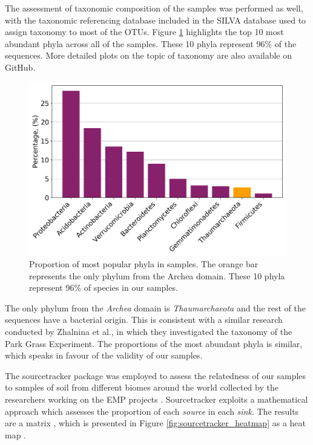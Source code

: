 \documentclass[12pt,twocolumn]{article} %
\begin{document}
\par
The assessment of taxonomic composition of the samples was performed as well, with the taxonomic referencing database included in the SILVA database used to assign taxonomy to most of the OTUs. Figure \ref{fig:top_taxa} highlights the top 10 most abundant phyla across all of the samples. These 10 phyla represent 96\% of the sequences. More detailed plots on the topic of taxonomy are also available on GitHub\cite{Anonymous2018}.
\begin{figure}[ht!] %
	\includegraphics[width=\linewidth]{top_10.png}
	\caption{Proportion of most popular phyla in samples. The orange bar represents the only phylum from the Archea domain. These 10 phyla represent 96\% of species in our samples.}
	\label{fig:top_taxa}
\end{figure}
\par
The only phylum from the \textit{Archea} domain is \textit{Thaumarchaeota} and the rest of the  sequences have a bacterial origin. This is consistent with a similar research conducted by Zhalnina et al.\cite{Zhalnina2014}, in which they investigated the taxonomy of the Park Grass Experiment. The proportions of the most abundant phyla is similar, which speaks in favour of the validity of our samples.
\par
The sourcetracker package was employed to assess the relatedness of our samples to samples of soil from different biomes around the world collected by the researchers working on the EMP projects . Sourcetracker exploits a mathematical approach which assesses the proportion of each \textit{source} in each \textit{sink}. The results are a matrix , which is presented in Figure \ref{fig:sourcetracker_heatmap} as a heat map . 
\end{document}
